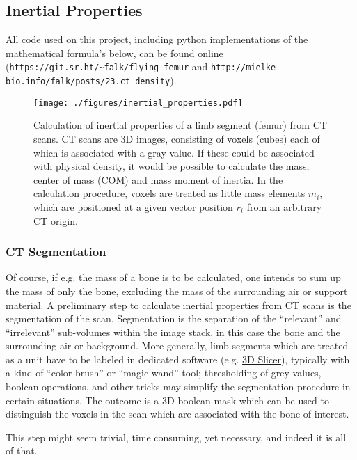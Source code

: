 \subsection{Inertial Properties}
\label{sec:org889ae9c}

All code used on this project, including python implementations of the mathematical formula's below, can be \href{https://git.sr.ht/\~falk/flying\_femur}{found online} (\nolinkurl{https://git.sr.ht/~falk/flying_femur} and \nolinkurl{http://mielke-bio.info/falk/posts/23.ct_density}).

\begin{figure}[htbp]
\centering
\texttt{[image: ./figures/inertial\_properties.pdf]}
\caption{\label{fig:inertials}Calculation of inertial properties of a limb segment (femur) from CT scans. CT scans are 3D images, consisting of voxels (cubes) each of which is associated with a gray value. If these could be associated with physical density, it would be possible to calculate the mass, center of mass (COM) and mass moment of inertia. In the calculation procedure, voxels are treated as little mass elements \(m_{i}\), which are positioned at a given vector position \(r_{i}\) from an arbitrary CT origin.}
\end{figure}

\subsubsection{CT Segmentation}
\label{sec:org0b7c4af}
Of course, if e.g. the mass of a bone is to be calculated, one intends to sum up the mass of only the bone, excluding the mass of the surrounding air or support material.
A preliminary step to calculate inertial properties from CT scans is the segmentation of the scan.
Segmentation is the separation of the ``relevant'' and ``irrelevant'' sub-volumes within the image stack, in this case the bone and the surrounding air or background.
More generally, limb segments which are treated as a unit have to be labeled in dedicated software (e.g. \href{https://www.slicer.org}{3D Slicer}), typically with a kind of ``color brush'' or ``magic wand'' tool; thresholding of grey values, boolean operations, and other tricks may simplify the segmentation procedure in certain situations.
The outcome is a 3D boolean mask which can be used to distinguish the voxels in the scan which are associated with the bone of interest.

This step might seem trivial, time consuming, yet necessary, and indeed it is all of that.


